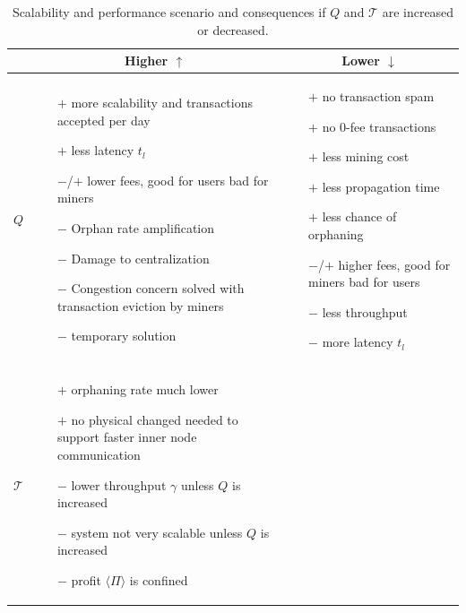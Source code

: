 \documentclass[USenglish]{uit-thesis}
\begin{document}
\begin{table}
	\centering
	\caption{Scalability and performance scenario and consequences if $Q$ and $\mathcal{T}$ are increased or decreased.}
	\label{tab:scalability_results}
	\begin{tabular}{|m{0.4cm}|m{4.8cm}|m{4.8cm}|}
	\cline{2-3}
	\multicolumn{1}{c|}{}&
	\multicolumn{1}{c|}{\textbf{Higher $\uparrow$}} &
	\multicolumn{1}{c|}{\textbf{Lower $\downarrow$}} \\ \hline
		 \textbf{$Q$}&\begin{itemize}
			\item [$+$] more scalability and transactions accepted per day
			\item [$+$] less latency $t_l$
			\item [$-$/$+$] lower fees, good for users bad for miners
			\item [$-$] Orphan rate amplification
			\item [$-$] Damage to centralization
			\item [$-$] Congestion concern solved
			with transaction eviction by miners
			\item [$-$] temporary solution
		\end{itemize}&\begin{itemize}
			\item [$+$] no transaction spam
			\item [$+$] no $0$-fee transactions
			\item [$+$] less mining cost
			\item [$+$] less propagation time
			\item [$+$] less chance of orphaning
			\item [$-$/$+$] higher fees, good for miners bad for users
			\item [$-$] less throughput
			\item [$-$] more latency $t_l$ %
		\end{itemize}\\ \midrule
		\hline
		\textbf{$\mathcal{T}$}&\begin{itemize}
			\item [$+$] orphaning rate much lower
			\item [$+$] no physical changed needed to support faster inner node communication
			\item [$-$] lower throughput $\gamma$ unless $Q$ is increased
			\item [$-$] system not very scalable unless $Q$ is increased
			\item [$-$] profit $\langle \Pi \rangle$ is confined

\end{itemize}
\end{tabular}
\end{table}
\end{document}
